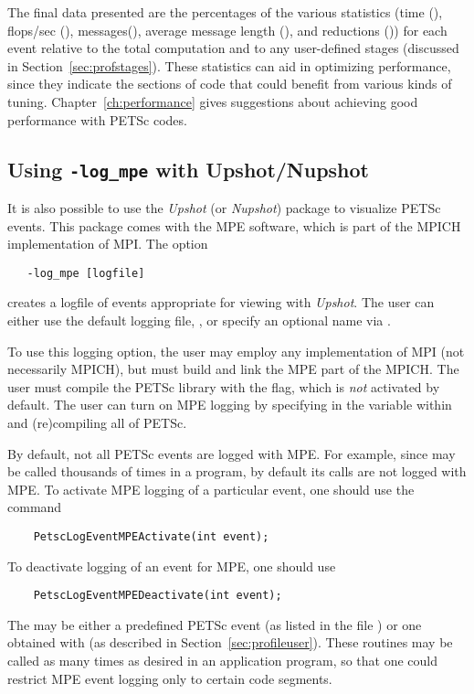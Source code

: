 The final data presented are the percentages of the various statistics
(time (), flops/sec (), messages(), average message length (),
and reductions ()) for each event relative to the total computation and to any
user-defined stages (discussed in Section~\ref{sec:profstages}).
These statistics can aid in optimizing performance, since they indicate the sections of code that
could benefit from various kinds of tuning.  Chapter~\ref{ch:performance} gives
suggestions about achieving good performance with PETSc codes.

\subsection{Using {\tt -log\_mpe} with Upshot/Nupshot}
\label{sec:mpelogs}

It is also possible to use the {\em Upshot} (or {\em Nupshot}) package
\cite{upshot}    to visualize PETSc events. 
This package comes with the MPE software, which is part of the MPICH
\cite{mpich-web-page} implementation of MPI.
The option 
\begin{verbatim}
   -log_mpe [logfile]
\end{verbatim}
creates a logfile of events appropriate for viewing with {\em Upshot}.
The user can either use the default logging file, , or
specify an optional name via .  

To use this logging option, the user may employ any implementation of
MPI (not necessarily MPICH), but must build and link the MPE part of
the MPICH.  The user must compile the PETSc library with the  flag, which is {\em not} activated by default. The user
can turn on MPE logging by specifying  in the  variable within  and (re)compiling all
of PETSc.

By default, not all PETSc events are logged with MPE. For example,
since  may be called thousands of times in a program,
by default its calls are not logged with MPE. To activate MPE logging of
a particular event, one should use the command 
\begin{verbatim}
    PetscLogEventMPEActivate(int event);
\end{verbatim}
To deactivate logging of an event for MPE, one should use 
\begin{verbatim}
    PetscLogEventMPEDeactivate(int event);
\end{verbatim}
The  may be either a predefined PETSc event (as listed in
the file ) or one obtained with
 (as described in
Section~\ref{sec:profileuser}).  These routines may be called as many
times as desired in an application program, so that one could restrict
MPE event logging only to certain code segments.

